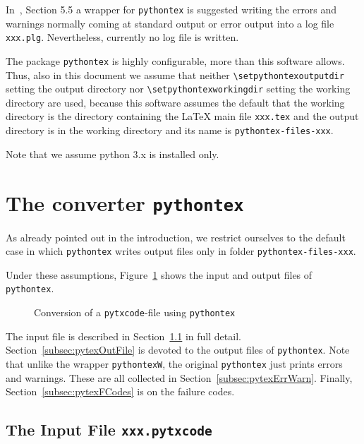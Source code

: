 \documentclass[a4paper, english]{article}%
\newcommand{\pytex}{\texttt{pythontex}}
\newcommand{\Ppytex}{package \texttt{pythontex}}
\newcommand{\cmd}[1]{\texttt{\textbackslash#1}}
\begin{document}
In~\cite{LatexPlugin}, Section 5.5 a wrapper for \pytex{} is suggested 
writing the errors and warnings normally coming at standard output or error output into a log file \texttt{xxx.plg}. 
Nevertheless, currently no log file is written. 

The \Ppytex{} is highly configurable, 
more than this software allows. 
Thus, also in this document 
we assume that neither \cmd{setpythontexoutputdir} setting the output directory 
nor \cmd{setpythontexworkingdir} setting the working directory are used, 
because this software assumes the default that the working directory is the directory 
containing the \LaTeX{} main file \texttt{xxx.tex} %
and the output directory is in the working directory 
and its name is \texttt{pythontex-files-xxx}. 

Note that we assume python 3.x is installed only. 


\section{The converter \pytex}\label{sec:pytex}

As already pointed out in the introduction, 
we restrict ourselves to the default case 
in which \pytex{} writes output files only in folder \texttt{pythontex-files-xxx}. 

Under these assumptions, Figure~\ref{fig:py2dir} shows the input and output files of \pytex{}. 

\begin{figure}[htb]
  \centering
  \caption{\label{fig:py2dir}Conversion of a \texttt{pytxcode}-file using \texttt{pythontex}}
  \end{figure}

  The input file is described in Section~\ref{subsec:pytexInFile} in full detail. 
  Section~\ref{subsec:pytexOutFile} is devoted to the output files of \pytex{}. 
  Note that unlike the wrapper \texttt{pythontexW}, the original \pytex{} 
  just prints errors and warnings. 
  These are all collected in Section~\ref{subsec:pytexErrWarn}. 
  Finally, Section~\ref{subsec:pytexFCodes} is on the failure codes. 

\subsection{The Input File \texttt{xxx.pytxcode}}\label{subsec:pytexInFile}
\end{document}
